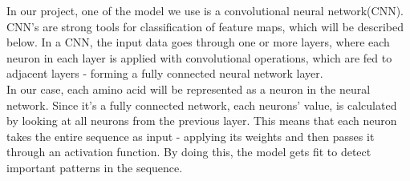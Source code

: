 In our project, one of the model we use is a convolutional neural network(CNN). CNN's are strong tools for classification of feature maps, which will be described below. In a CNN, the input data goes through one or more layers, where each neuron in each layer is applied with convolutional operations, which are fed to adjacent layers - forming a fully connected neural network layer. \\

\noindent
In our case, each amino acid will be represented as a neuron in the neural network. Since it's a fully connected network, each neurons' value, is calculated by looking at all neurons from the previous layer. This means that each neuron takes the entire sequence as input - applying its weights and then passes it through an activation function. By doing this, the model gets fit to detect important patterns in the sequence.
